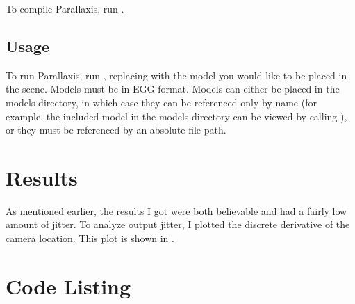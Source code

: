 To compile Parallaxis, run .

\subsection{Usage}
To run Parallaxis, run , replacing
\code{[model]} with the model you would like to be placed in the
scene. Models must be in EGG format. Models can either be placed in
the models directory, in which case they can be referenced only by
name (for example, the included model  in the models
directory can be viewed by calling ), or they
must be referenced by an absolute file path.

\section{Results}

As mentioned earlier, the results I got were both believable and had a
fairly low amount of jitter. To analyze output jitter, I plotted the
discrete derivative of the camera location. This plot is shown in
. 

\section{Code Listing}




